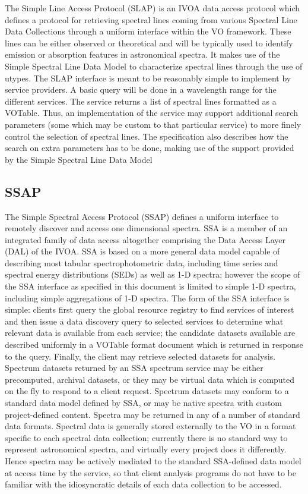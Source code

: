 \documentclass[11pt,a4paper]{ivoa}
\begin{document}
The Simple Line Access Protocol (SLAP) \citep{2010ivoa.specQ1209O} is an IVOA data access protocol which defines a protocol 
for retrieving spectral lines coming from various Spectral Line Data Collections through a 
uniform interface within the VO framework. These lines can be either observed or theoretical 
and will be typically used to identify emission or absorption features in astronomical 
spectra. It makes use of the Simple Spectral Line Data Model to characterize spectral lines 
through the use of utypes. The SLAP interface is meant to be reasonably simple to implement 
by service providers. A basic query will be done in a wavelength range for the different 
services. The service returns a list of spectral lines formatted as a VOTable. Thus, an 
implementation of the service may support additional search parameters (some which may be 
custom to that particular service) to more finely control the selection of spectral lines.
The specification also describes how the search on extra parameters has to be done, making 
use of the support provided by the Simple Spectral Line Data Model

\subsection{SSAP}

The Simple Spectral Access Protocol (SSAP) \citep{2012ivoa.spec.0210T} defines a uniform interface to remotely discover and 
access one dimensional spectra. SSA is a member of an integrated family of data access 
altogether comprising the Data Access Layer (DAL) of the IVOA. SSA is based on a more 
general data model capable of describing most tabular spectrophotometric data, including 
time series and spectral energy distributions (SEDs) as well as 1-D spectra; however the 
scope of the SSA interface as specified in this document is limited to simple 1-D spectra,
including simple aggregations of 1-D spectra. The form of the SSA interface is simple: 
clients first query the global resource registry to find services of interest and then 
issue a data discovery query to selected services to determine what relevant data is 
available from each service; the candidate datasets available are described uniformly 
in a VOTable format document which is returned in response to the query. Finally, the 
client may retrieve selected datasets for analysis. Spectrum datasets returned by an SSA 
spectrum service may be either precomputed, archival datasets, or they may be virtual 
data which is computed on the fly to respond to a client request. Spectrum datasets may 
conform to a standard data model defined by SSA, or may be native spectra with custom 
project-defined content. Spectra may be returned in any of a number of standard data 
formats. Spectral data is generally stored externally to the VO in a format specific to 
each spectral data collection; currently there is no standard way to represent astronomical 
spectra, and virtually every project does it differently. Hence spectra may be actively 
mediated to the standard SSA-defined data model at access time by the service, so that 
client analysis programs do not have to be familiar with the idiosyncratic details of each 
data collection to be accessed. 
\end{document}

